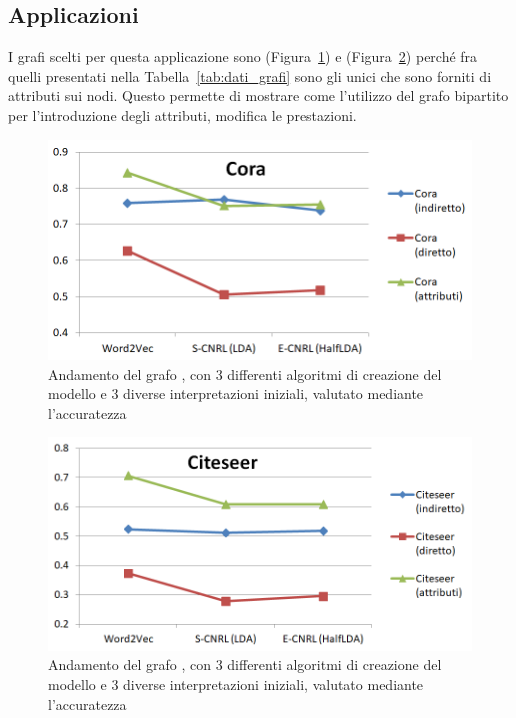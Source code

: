 \subsection{Applicazioni}
I grafi scelti per questa applicazione sono \cora (Figura~\ref{fig:VC_cora}) e \citeseer (Figura~\ref{fig:VC_citeseer}) perché fra quelli presentati nella Tabella~\ref{tab:dati_grafi} sono gli unici che sono forniti di attributi sui nodi. Questo permette di mostrare come l'utilizzo del grafo bipartito per l'introduzione degli attributi, modifica le prestazioni.
%
\begin{figure}[htp]
	\centering
	\includegraphics[width=\linewidth]{immagini/VC_cora}
	\caption{Andamento del grafo \cora, con 3 differenti algoritmi di creazione del modello e 3 diverse interpretazioni iniziali, valutato mediante l'accuratezza}
	\label{fig:VC_cora}
\end{figure}
%
\begin{figure}[htp]
	\centering
	\includegraphics[width=\linewidth]{immagini/VC_citeseer}
	\caption{Andamento del grafo \citeseer, con 3 differenti algoritmi di creazione del modello e 3 diverse interpretazioni iniziali, valutato mediante l'accuratezza}
	\label{fig:VC_citeseer}
\end{figure}
